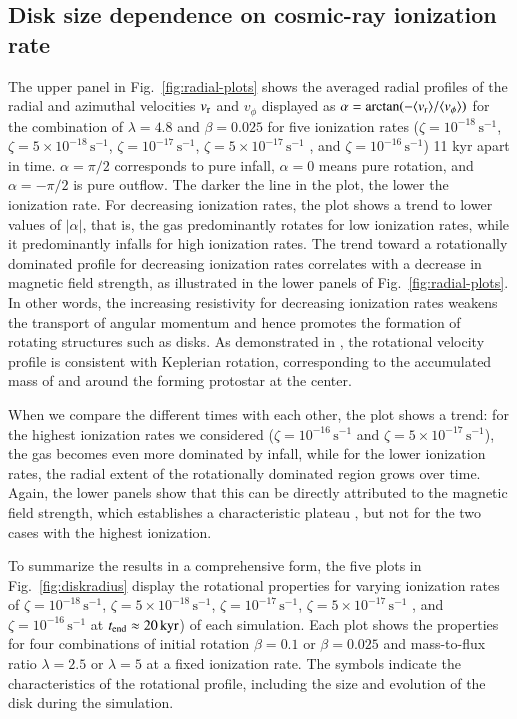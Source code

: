 \documentclass{aa}
\newcommand{\unit}[1]{\ensuremath{\, \mathrm{#1}}}
\newcommand{\Fig}[1]{Fig.~\ref{fig:#1}}    %
\begin{document}
\subsection{Disk size dependence on cosmic-ray ionization rate}
The upper panel in \Fig{radial-plots} shows the averaged radial profiles of the radial and azimuthal velocities $v_{\rm r}$ and $v_{\phi}$ displayed as $\alpha = \arctan(-\langle v_{\rm r}\rangle / \langle v_{\phi}\rangle)$ for the combination of $\lambda=4.8$ and $\beta=0.025$ for five ionization rates ($\zeta = 10^{-18} \unit{s}^{-1}$, $\zeta = 5 \times 10^{-18} \unit{s}^{-1}$, $\zeta = 10^{-17} \unit{s}^{-1}$, $\zeta = 5 \times 10^{-17} \unit{s}^{-1}$ , and $\zeta = 10^{-16} \unit{s}^{-1}$) 11 kyr apart in time. $\alpha=\pi/2$ corresponds to pure infall, $\alpha=0$ means pure rotation, and $\alpha=-\pi/2$ is pure outflow.
The darker the line in the plot, the lower the ionization rate. For decreasing ionization rates, the plot shows a trend to lower values of $|\alpha|$, that is, the gas predominantly rotates for low ionization rates, while it predominantly infalls for high ionization rates. 
The trend toward a rotationally dominated profile for decreasing ionization rates correlates with a decrease in magnetic field strength, as illustrated in the lower panels of \Fig{radial-plots}. 
In other words, the increasing resistivity for decreasing ionization rates weakens the transport of angular momentum and hence promotes the formation of rotating structures such as disks. 
As demonstrated in \cite{Zhao2016}, the rotational velocity profile is consistent with Keplerian rotation, corresponding to the accumulated mass of and around the forming protostar at the center. 


When we compare the different times with each other, the plot shows a trend: for the highest ionization rates we considered ($\zeta = 10^{-16} \unit{s}^{-1}$ and $\zeta = 5 \times 10^{-17} \unit{s}^{-1}$), the gas becomes even more dominated by infall, while for the lower ionization rates, the radial extent of the rotationally dominated region grows over time. 
Again, the lower panels show that this can be directly attributed to the magnetic field strength, which establishes a characteristic plateau \citep{Hennebelle2016,Masson2016}, but not for the two cases with the highest ionization.    

To summarize the results in a comprehensive form, the five plots in \Fig{diskradius} display the rotational properties for varying ionization rates of $\zeta = 10^{-18} \unit{s}^{-1}$, $\zeta = 5 \times 10^{-18} \unit{s}^{-1}$, $\zeta = 10^{-17} \unit{s}^{-1}$, $\zeta = 5 \times 10^{-17} \unit{s}^{-1}$ , and $\zeta = 10^{-16} \unit{s}^{-1}$ at $t_{\rm end} \approx 20 \unit{kyr}$) of each simulation. 
Each plot shows the properties for four combinations of initial rotation $\beta = 0.1$ or $\beta=0.025$ and mass-to-flux ratio $\lambda=2.5$ or $\lambda=5$ at a fixed ionization rate.
The symbols indicate the characteristics of the rotational profile, including the size and evolution of the disk during the simulation. 
 
\end{document}
